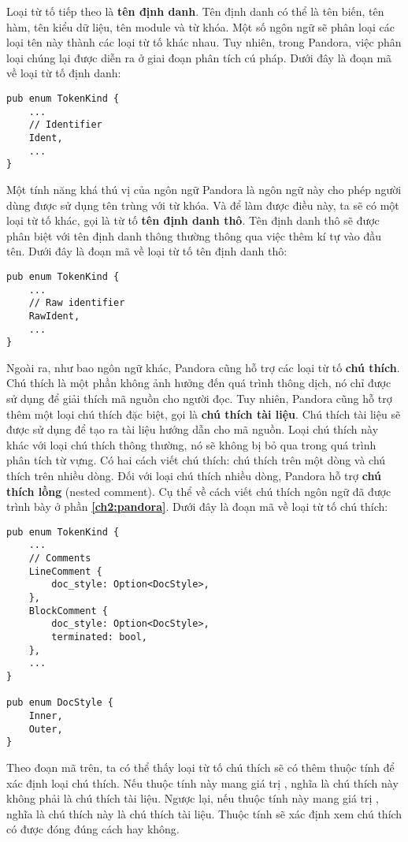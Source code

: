     Loại từ tố tiếp theo là \textbf{tên định danh}. Tên định danh có thể là tên biến, tên hàm, tên kiểu dữ liệu, tên module và từ khóa. Một số ngôn ngữ sẽ phân loại các loại tên này thành các loại từ tố khác nhau. Tuy nhiên, trong Pandora, việc phân loại chúng lại được diễn ra ở giai đoạn phân tích cú pháp. Dưới đây là đoạn mã về loại từ tố định danh:

\begin{lstlisting}[]
pub enum TokenKind {
    ...
    // Identifier
    Ident,
    ...
}
\end{lstlisting}

    Một tính năng khá thú vị của ngôn ngữ Pandora là ngôn ngữ này cho phép người dùng được sử dụng tên trùng với từ khóa. Và để làm được điều này, ta sẽ có một loại từ tố khác, gọi là từ tố \textbf{tên định danh thô}. Tên định danh thô sẽ được phân biệt với tên định danh thông thường thông qua việc thêm kí tự  vào đầu tên. Dưới đây là đoạn mã về loại từ tố tên định danh thô:

\begin{lstlisting}[]
pub enum TokenKind {
    ...
    // Raw identifier
    RawIdent,
    ...
}
\end{lstlisting}

    Ngoài ra, như bao ngôn ngữ khác, Pandora cũng hỗ trợ các loại từ tố \textbf{chú thích}. Chú thích là một phần không ảnh hưởng đến quá trình thông dịch, nó chỉ được sử dụng để giải thích mã nguồn cho người đọc. Tuy nhiên, Pandora cũng hỗ trợ thêm một loại chú thích đặc biệt, gọi là \textbf{chú thích tài liệu}. Chú thích tài liệu sẽ được sử dụng để tạo ra tài liệu hướng dẫn cho mã nguồn. Loại chú thích này khác với loại chú thích thông thường, nó sẽ không bị bỏ qua trong quá trình phân tích từ vựng. Có hai cách viết chú thích: chú thích trên một dòng và chú thích trên nhiều dòng. Đối với loại chú thích nhiều dòng, Pandora hỗ trợ \textbf{chú thích lồng} (nested comment). Cụ thể về cách viết chú thích ngôn ngữ đã được trình bày ở phần \textbf{\ref{ch2:pandora}}. Dưới đây là đoạn mã về loại từ tố chú thích:

\begin{lstlisting}[]
pub enum TokenKind {
    ...
    // Comments
    LineComment {
        doc_style: Option<DocStyle>,
    },
    BlockComment {
        doc_style: Option<DocStyle>,
        terminated: bool,
    },
    ...
}

pub enum DocStyle {
    Inner,
    Outer,
}
\end{lstlisting}

    Theo đoạn mã trên, ta có thể thấy loại từ tố chú thích sẽ có thêm thuộc tính  để xác định loại chú thích. Nếu thuộc tính này mang giá trị , nghĩa là chú thích này không phải là chú thích tài liệu. Ngược lại, nếu thuộc tính này mang giá trị , nghĩa là chú thích này là chú thích tài liệu. Thuộc tính  sẽ xác định xem chú thích có được đóng đúng cách hay không.

